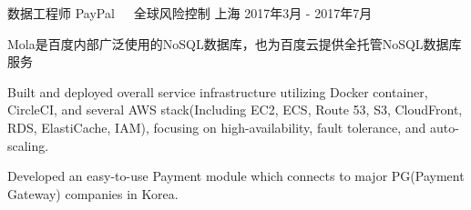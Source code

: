 \documentclass[11pt, a4paper, UTF8]{awesome-cv}
\begin{document}
%
\begin{cventries}
  \cventry
    {数据工程师} %
    {PayPal{\ \cdotp\ \ }全球风险控制} %
    {上海} %
    {2017年3月 - 2017年7月} %
    {
      \begin{cvitems} %
        \item {Mola是百度内部广泛使用的NoSQL数据库，也为百度云提供全托管NoSQL数据库服务}
        \item {Built and deployed overall service infrastructure utilizing Docker container, CircleCI, and several AWS stack(Including EC2, ECS, Route 53, S3, CloudFront, RDS, ElastiCache, IAM), focusing on high-availability, fault tolerance, and auto-scaling.}
        \item {Developed an easy-to-use Payment module which connects to major PG(Payment Gateway) companies in Korea.}
      \end{cvitems}
    }
    

\end{cventries}
\end{document}
